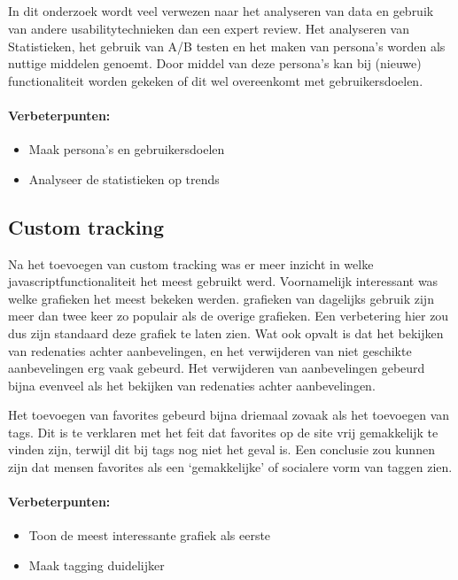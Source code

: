 \documentclass[a4paper, 10pt, pdftex]{report}
\begin{document}
    \subsection{\cite{Timmerman2008}}
    In dit onderzoek wordt veel verwezen naar het analyseren van data en gebruik van andere usabilitytechnieken dan een expert review. Het analyseren van Statistieken, het gebruik van A/B testen en het maken van persona's worden als nuttige middelen genoemt. Door middel van deze persona's kan bij (nieuwe) functionaliteit worden gekeken of dit wel overeenkomt met gebruikersdoelen.


    \paragraph{\textbf{Verbeterpunten:}}
      \begin{itemize}
        \item Maak persona's en gebruikersdoelen
        \item Analyseer de statistieken op trends
      \end{itemize}

    \subsection{Custom tracking}
    Na het toevoegen van custom tracking was er meer inzicht in welke javascriptfunctionaliteit het meest gebruikt werd. Voornamelijk interessant was welke grafieken het meest bekeken werden. grafieken van dagelijks gebruik zijn meer dan twee keer zo populair als de overige grafieken. Een verbetering hier zou dus zijn standaard deze grafiek te laten zien. Wat ook opvalt is dat het bekijken van redenaties achter aanbevelingen, en het verwijderen van niet geschikte aanbevelingen erg vaak gebeurd. Het verwijderen van aanbevelingen gebeurd bijna evenveel als het bekijken van redenaties achter aanbevelingen.

    Het toevoegen van favorites gebeurd bijna driemaal zovaak als het toevoegen van tags. Dit is te verklaren met het feit dat favorites op de site vrij gemakkelijk te vinden zijn, terwijl dit bij tags nog niet het geval is. Een conclusie zou kunnen zijn dat mensen favorites als een `gemakkelijke' of socialere vorm van taggen zien.

    \paragraph{\textbf{Verbeterpunten:}}
      \begin{itemize}
        \item Toon de meest interessante grafiek als eerste
        \item Maak tagging duidelijker
      \end{itemize}
\end{document}
